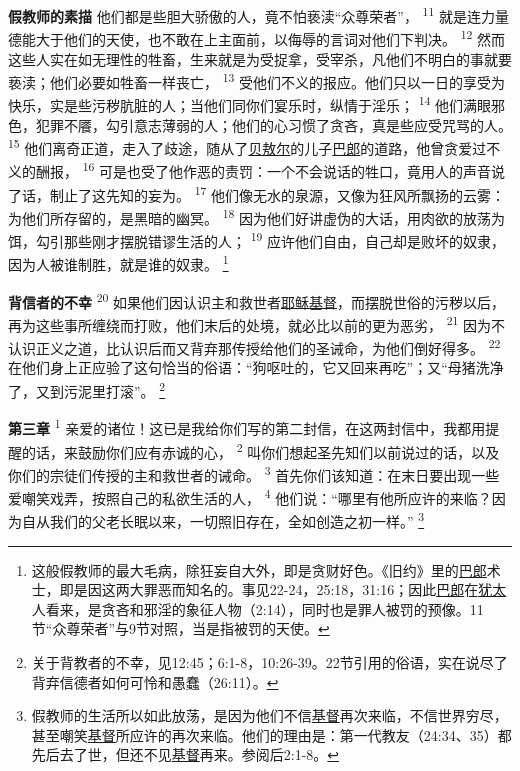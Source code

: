 \textbf{假教师的素描\quad}
他们都是些胆大骄傲的人，竟不怕亵渎“众尊荣者”，
\textsuperscript{11}
就是连力量德能大于他们的天使，也不敢在上主面前，以侮辱的言词对他们下判决。
\textsuperscript{12}
然而这些人实在如无理性的牲畜，生来就是为受捉拿，受宰杀，凡他们不明白的事就要亵渎；他们必要如牲畜一样丧亡，
\textsuperscript{13}
受他们不义的报应。他们只以一日的享受为快乐，实是些污秽肮脏的人；当他们同你们宴乐时，纵情于淫乐；
\textsuperscript{14}
他们满眼邪色，犯罪不餍，勾引意志薄弱的人；他们的心习惯了贪吝，真是些应受咒骂的人。
\textsuperscript{15}
他们离奇正道，走入了歧途，随从了\uline{贝敖尔}的儿子\uline{巴郎}的道路，他曾贪爱过不义的酬报，
\textsuperscript{16}
可是也受了他作恶的责罚：一个不会说话的牲口，竟用人的声音说了话，制止了这先知的妄为。
\textsuperscript{17}
他们像无水的泉源，又像为狂风所飘扬的云雾：为他们所存留的，是黑暗的幽冥。
\textsuperscript{18}
因为他们好讲虚伪的大话，用肉欲的放荡为饵，勾引那些刚才摆脱错谬生活的人；
\textsuperscript{19}
应许他们自由，自己却是败坏的奴隶，因为人被谁制胜，就是谁的奴隶。
\footnote{这般假教师的最大毛病，除狂妄自大外，即是贪财好色。《旧约》里的\uline{巴郎}术士，即是因这两大罪恶而知名的。事见22-24，25:18，31:16；因此\uline{巴郎}在\uline{犹太}人看来，是贪吝和邪淫的象征人物（2:14），同时也是罪人被罚的预像。11节“众尊荣者”与9节对照，当是指被罚的天使。}

\textbf{背信者的不幸\quad}
\textsuperscript{20}
如果他们因认识主和救世者\uline{耶稣}\uline{基督}，而摆脱世俗的污秽以后，再为这些事所缠绕而打败，他们末后的处境，就必比以前的更为恶劣，
\textsuperscript{21}
因为不认识正义之道，比认识后而又背弃那传授给他们的圣诫命，为他们倒好得多。
\textsuperscript{22}
在他们身上正应验了这句恰当的俗语：“狗呕吐的，它又回来再吃”；又“母猪洗净了，又到污泥里打滚”。
\footnote{关于背教者的不幸，见12:45；6:1-8，10:26-39。22节引用的俗语，实在说尽了背弃信德者如何可怜和愚蠢（26:11）。}

\textbf{第三章\quad}
\textsuperscript{1}
亲爱的诸位！这已是我给你们写的第二封信，在这两封信中，我都用提醒的话，来鼓励你们应有赤诚的心，
\textsuperscript{2}
叫你们想起圣先知们以前说过的话，以及你们的宗徒们传授的主和救世者的诫命。
\textsuperscript{3}
首先你们该知道：在末日要出现一些爱嘲笑戏弄，按照自己的私欲生活的人，
\textsuperscript{4}
他们说：“哪里有他所应许的来临？因为自从我们的父老长眠以来，一切照旧存在，全如创造之初一样。”
\footnote{假教师的生活所以如此放荡，是因为他们不信\uline{基督}再次来临，不信世界穷尽，甚至嘲笑\uline{基督}所应许的再次来临。他们的理由是：第一代教友（24:34、35）都先后去了世，但还不见\uline{基督}再来。参阅后2:1-8。}

